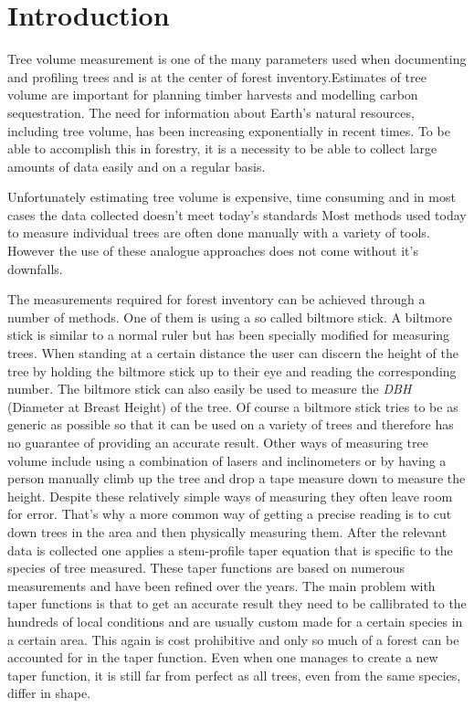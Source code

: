

\newcommand{\degree}{$^\circ$}

\section{Introduction}
Tree volume measurement is one of the many parameters used when documenting and profiling trees and is at the center of forest inventory.Estimates of tree volume are important for planning timber harvests and modelling carbon sequestration. The need for information about Earth's natural resources, including tree volume, has been increasing exponentially in recent times. To be able to accomplish this in forestry, it is a necessity to be able to collect large amounts of data easily and on a regular basis. 

Unfortunately estimating tree volume is expensive, time consuming and in most cases the data collected doesn't meet today's standards \cite{digital imaged based tree measurement for forest inventory}
Most methods used today to measure individual trees are often done manually with a variety of tools. However the use of these analogue approaches does not come without it's downfalls.

The measurements required for forest inventory can be achieved through a number of methods. One of them is using a so called biltmore stick. A biltmore stick is similar to a normal ruler but has been specially modified for measuring trees. When standing at a certain distance the user can discern the height of the tree by holding the biltmore stick up to their eye and reading the corresponding number. The biltmore stick can also easily be used to measure the \emph{DBH} (Diameter at Breast Height) of the tree. Of course a biltmore stick tries to be as generic as possible so that it can be used on a variety of trees and therefore has no guarantee of providing an accurate result. Other ways of measuring tree volume include using a combination of lasers and inclinometers or by having a person manually climb up the tree and drop a tape measure down to measure the height. Despite these relatively simple ways of measuring they often leave room for error. That’s why a more common way of getting a precise reading is to cut down trees in the area and then physically measuring them. After the relevant data is collected one applies a stem-profile taper equation that is specific to the species of tree measured. These taper functions are based on numerous measurements and have been refined over the years. The main problem with taper functions is that to get an accurate result they need to be callibrated to the hundreds of local conditions and are usually custom made for a certain species in a certain area. This again is cost prohibitive and only so much of a forest can be accounted for in the taper function. Even when one manages to create a new taper function, it is still far from perfect as all trees, even from the same species, differ in shape.

